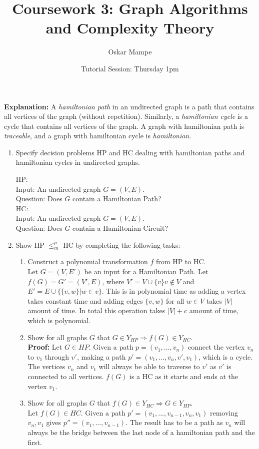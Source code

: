 \documentclass[11pt,a4paper]{article}
\title{Coursework 3: Graph Algorithms and Complexity Theory}
\author{Oskar Mampe}
\date{Tutorial Session: Thursday 1pm}
\newcommand{\hc} {HC}
\newcommand{\hp} {HP}
\begin{document}
\maketitle
\thispagestyle{empty}

\textbf{Explanation: } A \textit{hamiltonian path} in an undirected graph is a path that contains all vertices of the graph (without repetition).  Similarly, a \textit{hamiltonian cycle} is a cycle that contains all vertices of the graph.  A graph with hamiltonian path is \textit{traceable}, and a graph with hamiltonian cycle is \textit{hamiltonian}.

\begin{enumerate}
    \item Specify decision problems \hp{} and \hc{}  dealing with hamiltonian paths and hamiltonian cycles in undirected graphs.
    
    \hp{}:\\ Input: An undirected graph $G = (V, E)$.\\ Question: Does $G$ contain a Hamiltonian Path?\\


    \hc{}:\\ Input: An undirected graph $G = (V, E)$.\\ Question: Does $G$ contain a Hamiltonian Circuit?\\

    \item Show \hp{} $\leq^p_m$ \hc{} by completing the following tasks: 
        \begin{enumerate}
            \item Construct a polynomial transformation $f$ from \hp{} to \hc{}.\\
            Let $G = (V, E')$ be an input for a Hamiltonian Path. Let $f(G) = G'  = (V', E)$,
             where $V' = V \cup \{v\} v \notin V$ and $E' = E \cup \{ \{ v, w\} | w \in v\}$.
             This is in polynomial time as adding a vertex takes constant time and adding edges $\{v, w \}$
              for all $w \in V$ takes $|V|$ amount of time. In total this operation takes $|V| + c$ amount of time, which is polynomial. 
            \item Show for all graphs $G$ that $G \in Y_{\hp{}} \Rightarrow f(G) \in Y_{\hc{}}$.\\
            \textbf{Proof: }  Let $G \in \hp{}$.
             Given a path $p = (v_1, \ldots, v_n)$ connect the vertex $v_n$ to $v_1$ through $v'$,
              making a path $p' = (v_1, \ldots, v_n, v', v_1)$, which is a cycle.
               The vertices $v_n$ and $v_1$ will always be able to traverse to $v'$
                as $v'$ is connected to all vertices. $f(G)$ is a \hc{} as it starts and ends at the vertex $v_1$.
            \item Show for all graphs $G$ that $f(G) \in Y_{\hc{}} \Rightarrow G \in Y_{\hp{}}$.\\
            Let $f(G) \in \hc{}$. Given a path $p' = (v_1, \ldots, v_{n-1}, v_n, v_1)$ removing $v_n, v_1$ gives $p'' = (v_1, \ldots, v_{n-1})$.
            The result has to be a path as $v_n$ will always be the bridge between the last node of a hamiltonian path and the first.
            

\end{enumerate}
\end{enumerate}
\end{document}
